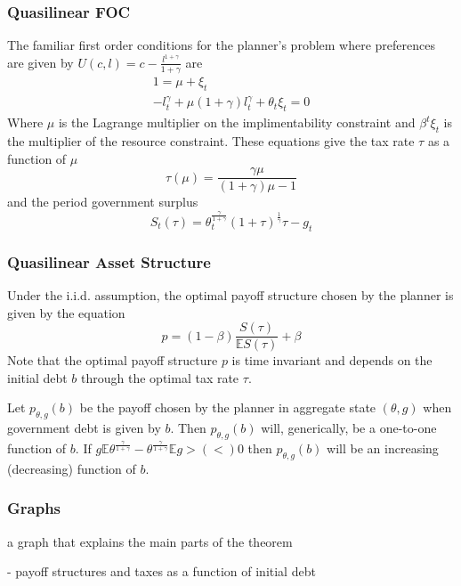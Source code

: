 \documentclass{beamer}
\newcommand{\EE}{\mathbb E}
\begin{document}
\begin{frame}
	\frametitle{Quasilinear FOC}
	The familiar first order conditions for the planner's problem where preferences are given by $U(c,l) = c - \frac{l^{1+\gamma}}{1+\gamma}$ are
	\begin{align*}
		1 = \mu +\xi_t\\
		-l_t^\gamma+\mu(1+\gamma)l_t^\gamma+\theta_t\xi_t = 0
	\end{align*}Where $\mu$ is the Lagrange multiplier on the implimentability constraint and $\beta^t\xi_t$ is the multiplier of the resource constraint.   These equations give the tax rate $\tau$ as a function of $\mu$
	\[
		\tau(\mu) = \frac{\gamma\mu}{(1+\gamma)\mu-1}
	\] and the period government surplus 
	\[
		S_t(\tau) = \theta_t^\frac\gamma{1+\gamma}(1+\tau)^\frac1\gamma\tau-g_t
	\]
\end{frame}

\begin{frame}
	\frametitle{Quasilinear Asset Structure}
	Under the i.i.d. assumption, the optimal payoff structure chosen by the planner is given by the equation
	\[
		p = (1-\beta)\frac{S(\tau)}{\EE S(\tau)} + \beta
	\]Note that the optimal payoff structure $p$ is time invariant and depends on the initial debt $b$ through the optimal tax rate $\tau$.
	\begin{lemma}  Let $p_{\theta,g}(b)$ be the payoff chosen by the planner in aggregate state $(\theta,g)$ when government debt is given by $b$.  Then $p_{\theta,g}(b)$ will, generically, be a one-to-one function of $b$.  If $g\EE\theta^\frac{\gamma}{1+\gamma}-\theta^\frac{\gamma}{1+\gamma}\EE g > (<) 0$ then $p_{\theta,g}(b)$ will be an increasing (decreasing) function of $b$. 
	\end{lemma}
\end{frame}

  \begin{frame}
   \frametitle{Graphs }
    a graph that explains the main parts of the theorem
   
   - payoff structures and taxes as a function of initial debt
  \end{frame}
\end{document}
